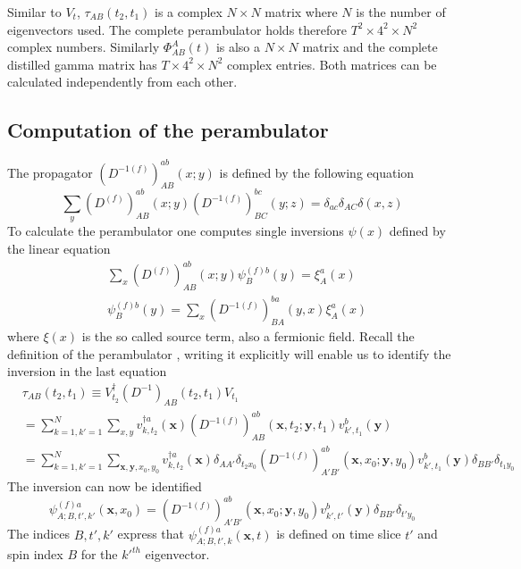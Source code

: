     Similar to $V_t$, $\tau_{AB}(t_2,t_1)$ is a complex $N \times N$ matrix where $N$ is the number of eigenvectors used. The complete perambulator holds therefore $T^2 \times 4^2 \times N^2$ complex numbers. Similarly $\Phi_{AB}^A(t)$ is also a $N \times N$ matrix and the complete distilled gamma matrix has $T \times 4^2 \times N^2$ complex entries. Both matrices can be calculated independently from each other.
    
\subsection{Computation of the perambulator}
    The propagator $(D^{-1(f)})^{ab}_{AB}(x;y)$ is defined by the following equation \cite{four_quark_correlation_functions}
    \begin{equation}
        \sum_{y}(D^{(f)})^{ab}_{AB}(x;y)(D^{-1(f)})^{bc}_{BC}(y;z) = \delta_{ac}\delta_{AC}\delta(x,z)
    \end{equation}
    To calculate the perambulator one computes single inversions $\psi(x)$ defined by the linear equation
    \begin{equation}
        \begin{aligned}\label{inversion_term}
            &\sum_{x}(D^{(f)})^{ab}_{AB}(x;y)\psi^{(f)b}_{B}(y) = \xi^a_A(x)\\
            &\psi^{(f)b}_{B}(y) = \sum_{x}(D^{-1(f)})^{ba}_{BA}(y,x)\xi^a_A(x)
        \end{aligned}
    \end{equation}
    where $\xi(x)$ is the so called source term, also a fermionic field. Recall the definition of the perambulator , writing it explicitly will enable us to identify the inversion in the last equation \cite{bachelor_thesis_jan}
    \begin{equation}\label{perambulator_explicit}
        \begin{aligned}
            &\tau_{AB}(t_2,t_1) \equiv V^\dagger_{t_2}(D^{-1})_{AB}(t_2,t_1)V_{t_1}\\
            &= \sum_{k=1,k'=1}^N \sum_{x,y}
            v_{k,t_2}^{\dagger a}(\textbf{x}) 
            (D^{-1(f)})^{ab}_{AB}(\textbf{x},t_2;\textbf{y},t_1)
            v_{k',t_1}^{b}(\textbf{y})\\
            &= \sum_{k=1,k'=1}^N \sum_{\textbf{x},\textbf{y},x_0,y_0}
            v_{k,t_2}^{\dagger a}(\textbf{x})\delta_{AA'}\delta_{t_2 x_0}
            (D^{-1(f)})^{ab}_{A'B'}(\textbf{x},x_0;\textbf{y},y_0)
            v_{k',t_1}^{b}(\textbf{y})\delta_{BB'}\delta_{t_1 y_0}
        \end{aligned}
    \end{equation}
    The inversion  can now be identified
    \begin{equation}
        \psi^{(f)a}_{A;B,t',k'}(\textbf{x},x_0) = (D^{-1(f)})^{ab}_{A'B'}(\textbf{x},x_0;\textbf{y},y_0)
            v_{k',t'}^{b}(\textbf{y})\delta_{BB'}\delta_{t'y_0}
    \end{equation}
    The indices $B,t',k'$ express that $\psi^{(f)a}_{A;B,t',k}(\textbf{x},t)$ is defined on time slice $t'$ and spin index $B$ for the $k'^{th}$ eigenvector.\\
    
